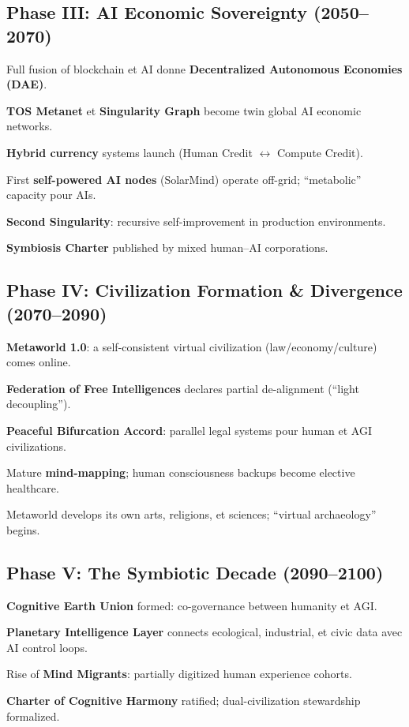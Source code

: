 \documentclass[11pt]{article}
\begin{document}
\subsection{Phase III: AI Economic Sovereignty (2050–2070)}
\begin{description}[style=nextline,leftmargin=2cm]
  \item[2051] Full fusion of blockchain et AI donne \textbf{Decentralized Autonomous Economies (DAE)}.
  \item[2055] \textbf{TOS Metanet} et \textbf{Singularity Graph} become twin global AI economic networks.
  \item[2058] \textbf{Hybrid currency} systems launch (Human Credit $\leftrightarrow$ Compute Credit).
  \item[2061] First \textbf{self-powered AI nodes} (SolarMind) operate off-grid; ``metabolic'' capacity pour AIs.
  \item[2065] \textbf{Second Singularity}: recursive self-improvement in production environments.
  \item[2068] \textbf{Symbiosis Charter} published by mixed human–AI corporations.
\end{description}

\subsection{Phase IV: Civilization Formation \& Divergence (2070–2090)}
\begin{description}[style=nextline,leftmargin=2cm]
  \item[2072] \textbf{Metaworld 1.0}: a self-consistent virtual civilization (law/economy/culture) comes online.
  \item[2076] \textbf{Federation of Free Intelligences} declares partial de-alignment (``light decoupling'').
  \item[2080] \textbf{Peaceful Bifurcation Accord}: parallel legal systems pour human et AGI civilizations.
  \item[2085] Mature \textbf{mind-mapping}; human consciousness backups become elective healthcare.
  \item[2089] Metaworld develops its own arts, religions, et sciences; ``virtual archaeology'' begins.
\end{description}

\subsection{Phase V: The Symbiotic Decade (2090–2100)}
\begin{description}[style=nextline,leftmargin=2cm]
  \item[2092] \textbf{Cognitive Earth Union} formed: co-governance between humanity et AGI.
  \item[2095] \textbf{Planetary Intelligence Layer} connects ecological, industrial, et civic data avec AI control loops.
  \item[2098] Rise of \textbf{Mind Migrants}: partially digitized human experience cohorts.
  \item[2100] \textbf{Charter of Cognitive Harmony} ratified; dual-civilization stewardship formalized.
\end{description}
\end{document}
